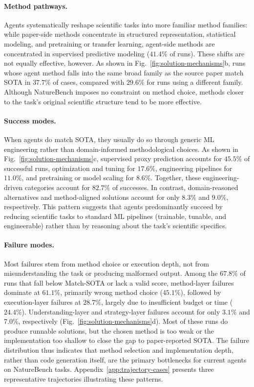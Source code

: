 \paragraph{Method pathways.}
Agents systematically reshape scientific tasks into more familiar method families: while paper-side methods concentrate in structured representation, statistical modeling, and pretraining or transfer learning, agent-side methods are concentrated in supervised predictive modeling ($41.4\%$ of runs). These shifts are not equally effective, however. As shown in Fig.~\ref{fig:solution-mechanisms}b, runs whose agent method falls into the same broad family as the source paper match SOTA in $37.7\%$ of cases, compared with $29.6\%$ for runs using a different family. Although NatureBench imposes no constraint on method choice, methods closer to the task's original scientific structure tend to be more effective.

\paragraph{Success modes.}
When agents do match SOTA, they usually do so through generic ML engineering rather than domain-informed methodological choices. As shown in Fig.~\ref{fig:solution-mechanisms}c, supervised proxy prediction accounts for $45.5\%$ of successful runs, optimization and tuning for $17.6\%$, engineering pipelines for $11.0\%$, and pretraining or model scaling for $8.6\%$. Together, these engineering-driven categories account for $82.7\%$ of successes. In contrast, domain-reasoned alternatives and method-aligned solutions account for only $8.3\%$ and $9.0\%$, respectively. This pattern suggests that agents predominantly succeed by reducing scientific tasks to standard ML pipelines (trainable, tunable, and engineerable) rather than by reasoning about the task's scientific specifics.

\paragraph{Failure modes.}
Most failures stem from method choice or execution depth, not from misunderstanding the task or producing malformed output. Among the $67.8\%$ of runs that fall below Match-SOTA or lack a valid score, method-layer failures dominate at $61.1\%$, primarily wrong method choice ($45.1\%$), followed by execution-layer failures at $28.7\%$, largely due to insufficient budget or time ($24.4\%$). Understanding-layer and strategy-layer failures account for only $3.1\%$ and $7.0\%$, respectively (Fig.~\ref{fig:solution-mechanisms}d). Most of these runs do produce runnable solutions, but the chosen method is too weak or the implementation too shallow to close the gap to paper-reported SOTA. The failure distribution thus indicates that method selection and implementation depth, rather than code generation itself, are the primary bottlenecks for current agents on NatureBench tasks. Appendix~\ref{app:trajectory-cases} presents three representative trajectories illustrating these patterns.

